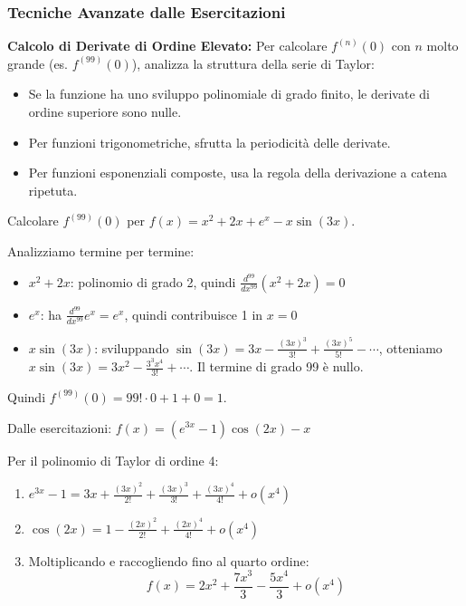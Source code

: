 \subsubsection{Tecniche Avanzate dalle Esercitazioni}

\begin{info}
\textbf{Calcolo di Derivate di Ordine Elevato:}
Per calcolare $f^{(n)}(0)$ con $n$ molto grande (es. $f^{(99)}(0)$), analizza la struttura della serie di Taylor:
\begin{itemize}
    \item Se la funzione ha uno sviluppo polinomiale di grado finito, le derivate di ordine superiore sono nulle.
    \item Per funzioni trigonometriche, sfrutta la periodicità delle derivate.
    \item Per funzioni esponenziali composte, usa la regola della derivazione a catena ripetuta.
\end{itemize}
\end{info}

\begin{esempio}
Calcolare $f^{(99)}(0)$ per $f(x) = x^2 + 2x + e^x - x\sin(3x)$.

Analizziamo termine per termine:
\begin{itemize}
    \item $x^2 + 2x$: polinomio di grado 2, quindi $\frac{d^{99}}{dx^{99}}(x^2 + 2x) = 0$
    \item $e^x$: ha $\frac{d^{99}}{dx^{99}}e^x = e^x$, quindi contribuisce 1 in $x=0$
    \item $x\sin(3x)$: sviluppando $\sin(3x) = 3x - \frac{(3x)^3}{3!} + \frac{(3x)^5}{5!} - \cdots$, otteniamo $x\sin(3x) = 3x^2 - \frac{3^3x^4}{3!} + \cdots$. Il termine di grado 99 è nullo.
\end{itemize}
Quindi $f^{(99)}(0) = 99! \cdot 0 + 1 + 0 = 1$.
\end{esempio}

\begin{esempio}
Dalle esercitazioni: $f(x) = (e^{3x}-1)\cos(2x) - x$

Per il polinomio di Taylor di ordine 4:
\begin{enumerate}
    \item $e^{3x} - 1 = 3x + \frac{(3x)^2}{2!} + \frac{(3x)^3}{3!} + \frac{(3x)^4}{4!} + o(x^4)$
    \item $\cos(2x) = 1 - \frac{(2x)^2}{2!} + \frac{(2x)^4}{4!} + o(x^4)$
    \item Moltiplicando e raccogliendo fino al quarto ordine:
    \[ f(x) = 2x^2 + \frac{7x^3}{3} - \frac{5x^4}{3} + o(x^4) \]
\end{enumerate}
\end{esempio}

